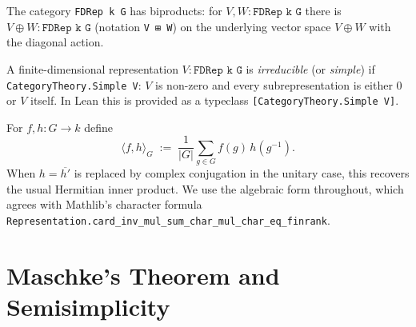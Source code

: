 \begin{definition}
  \label{def:direct-sum}
  \mathlibok
  The category \texttt{FDRep k G} has biproducts: for $V, W : \texttt{FDRep k G}$
  there is $V \oplus W : \texttt{FDRep k G}$ (notation \texttt{V ⊞ W}) on the
  underlying vector space $V \oplus W$ with the diagonal action.
\end{definition}

\begin{definition}
  \label{def:simple}
  \mathlibok
  A finite-dimensional representation $V : \texttt{FDRep k G}$ is
  \emph{irreducible} (or \emph{simple}) if
  \texttt{CategoryTheory.Simple V}: $V$ is non-zero and every subrepresentation
  is either $0$ or $V$ itself. In Lean this is provided as a typeclass
  \texttt{[CategoryTheory.Simple V]}.
\end{definition}

\begin{definition}
  \label{def:inner-prod}
  For $f, h : G \to k$ define
  \[
    \langle f, h\rangle_G \;:=\; \frac{1}{|G|}\sum_{g \in G} f(g)\, h(g^{-1}).
  \]
  When $h = \overline{h'}$ is replaced by complex conjugation in the unitary
  case, this recovers the usual Hermitian inner product. We use the algebraic
  form throughout, which agrees with Mathlib's character formula
  \texttt{Representation.card\_inv\_mul\_sum\_char\_mul\_char\_eq\_finrank}.
\end{definition}


\chapter{Maschke's Theorem and Semisimplicity}
\label{chap:maschke}

